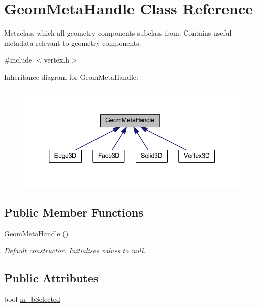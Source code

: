 \hypertarget{class_geom_meta_handle}{\section{Geom\-Meta\-Handle Class Reference}
\label{class_geom_meta_handle}
}


Metaclass which all geometry components subclass from. Contains useful metadata relevant to geometry components.  




{\ttfamily \#include $<$vertex.\-h$>$}



Inheritance diagram for Geom\-Meta\-Handle\-:\nopagebreak
\begin{figure}[H]
\begin{center}
\leavevmode
\includegraphics[width=342pt]{class_geom_meta_handle__inherit__graph}
\end{center}
\end{figure}
\subsection*{Public Member Functions}
\begin{DoxyCompactItemize}
\item 
\hypertarget{class_geom_meta_handle_a1787f612c3a943eda6368722713681f9}{\hyperlink{class_geom_meta_handle_a1787f612c3a943eda6368722713681f9}{Geom\-Meta\-Handle} ()}\label{class_geom_meta_handle_a1787f612c3a943eda6368722713681f9}

\begin{DoxyCompactList}\small\item\em Default constructor. Initialises values to null. \end{DoxyCompactList}\end{DoxyCompactItemize}
\subsection*{Public Attributes}
\begin{DoxyCompactItemize}
\item 
bool \hyperlink{class_geom_meta_handle_a545e915bdbffcafcf5cd9381b404874c}{m\-\_\-b\-Selected}
\end{DoxyCompactItemize}


